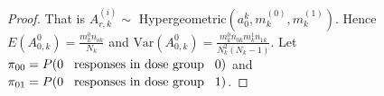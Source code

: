 \documentclass[12pt,oneside]{report}
\theoremstyle{definition}
\theoremstyle{mystyle}
\begin{document}
\begin{proof}
That is $A_{r,k}^{(i)} \sim $ Hypergeometric$\left(a_{0}^{k},m_{k}^{(0)},m_{k}^{(1)}\right)$. Hence  $E(A_{0,k}^{0})=\displaystyle\frac{m_{k}^{0}n_{ok}}{N_{k}}$ and $	\text{Var}(A_{0,k}^{0})=\displaystyle\frac{m_{k}^{0}n_{0k}m_{k}^{1}n_{1k}}{N_{k}^{2}(N_{k}-1)}$. 	Let $\pi_{00}=P(0\hspace{3mm} \textrm{responses in dose group}\hspace{3mm}0)$ and  $\pi_{01}=P(0\hspace{3mm} \textrm{responses in dose group}\hspace{3mm}1)$.
	
	

\end{proof}
\end{document}
